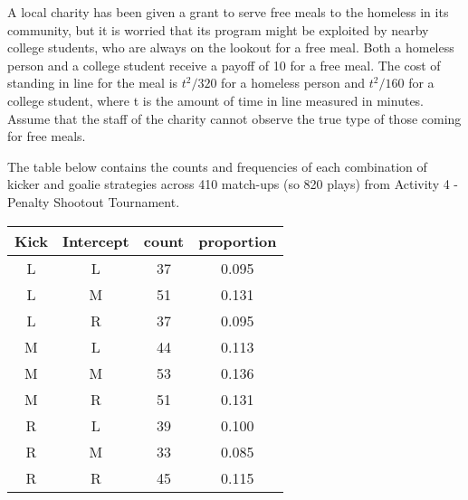 \documentclass[addpoints ]{exam}
\begin{document}
\begin{questions}
\newpage


\question
A local charity has been given a grant to serve free meals to the homeless in its community, but it is worried that its program might be exploited by nearby college students, who are always on the lookout for a free meal.
Both a homeless person and a college student receive a payoff of 10 for a free meal.
The cost of standing in line for the meal is 
$t^2 / 320$ for a homeless person and 
$t^2 / 160$ for a college student,
where t is the amount of time in line measured in minutes.
Assume that the staff of the charity cannot observe the true type of those coming for free meals.


\newpage

\question 

The table below contains the counts and frequencies of each combination of
kicker and goalie strategies across 410 match-ups (so 820 plays) 
from Activity 4 - Penalty Shootout Tournament.

\begin{table}[!h]
\centering
\begin{tabular}{|c|c|c|c|}
\hline
Kick & Intercept & count & proportion\\
\hline
L & L & 37 & 0.095\\
\hline
L & M & 51 & 0.131\\
\hline
L & R & 37 & 0.095\\
\hline
M & L & 44 & 0.113\\
\hline
M & M & 53 & 0.136\\
\hline
M & R & 51 & 0.131\\
\hline
R & L & 39 & 0.100\\
\hline
R & M & 33 & 0.085\\
\hline
R & R & 45 & 0.115\\
\hline
\end{tabular}
\end{table}


\end{questions}
\end{document}
